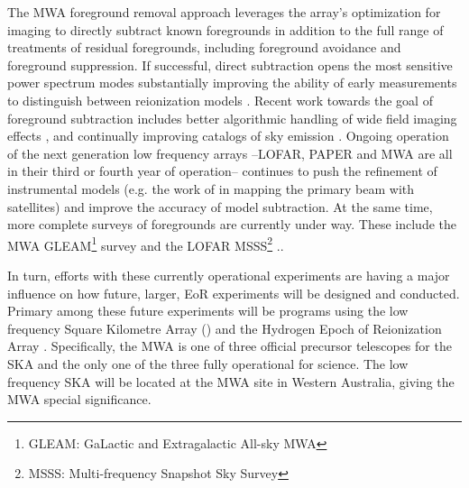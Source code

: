 \documentclass[twolcolumn,iop]{emulateapj}
\begin{document}
The MWA foreground removal approach leverages the array's optimization for imaging to directly subtract known foregrounds in addition to the full range of treatments of residual foregrounds, including foreground avoidance and foreground suppression.  If successful, direct subtraction opens the most sensitive power spectrum modes substantially improving the ability of early measurements to distinguish between reionization models \citep{Beardsley:2013p9952,Pober:2014p10390}. Recent work towards the goal of foreground subtraction includes better algorithmic handling of wide field imaging effects \citep{Tasse:2012p9459,Bhatnagar..2013ApJ,Sullivan:2012p9457,Ord:2010p8442}, and continually improving catalogs of sky emission \citep{deOliveiraCosta:2008p2242,Jacobs:2011p8438,Hurley-walker:2014p45,2014AAS...22342101M}. Ongoing operation of the next generation low frequency arrays --LOFAR, PAPER and MWA are all in their  third or fourth year of operation-- continues to push the refinement of instrumental models (e.g. the work of \cite{2015RaSc...50..614N} in mapping the primary beam with satellites) and improve the accuracy of model subtraction.  At the same time, more complete surveys of foregrounds are currently under way. These include the MWA GLEAM\footnote{GLEAM: GaLactic and Extragalactic All-sky MWA} survey \citep{2015PASA...32...25W}  and the LOFAR MSSS\footnote{MSSS: Multi-frequency Snapshot Sky Survey} \citep{2015A&A...582A.123H}..   

In turn, efforts with these currently operational experiments are having a major influence on how future, larger, EoR experiments will be designed and conducted.  Primary among these future experiments will be programs using the low frequency Square Kilometre Array (\cite{2014aska.confE...1K}) and the Hydrogen Epoch of Reionization Array \citep[HERA][]{Pober:2014p10390}.  Specifically, the MWA is one of three official precursor telescopes for the SKA and the only one of the three fully operational for science.  The low frequency SKA will be located at the MWA site in Western Australia, giving the MWA special significance.
\end{document}
